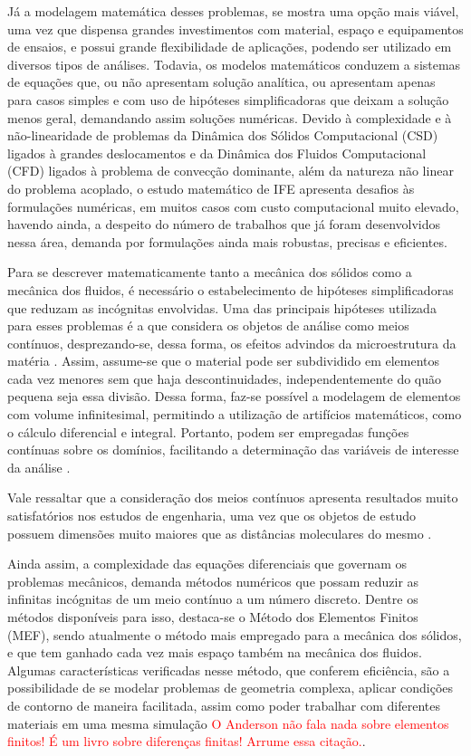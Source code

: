 Já a modelagem matemática desses problemas, se mostra uma opção mais viável, uma vez que dispensa grandes investimentos com material, espaço e equipamentos de ensaios, e possui grande flexibilidade de aplicações, podendo ser utilizado em diversos tipos de análises. Todavia, os modelos matemáticos conduzem a sistemas de equações que, ou não apresentam solução analítica, ou apresentam apenas para casos simples e com uso de hipóteses simplificadoras que deixam a solução menos geral, demandando assim soluções numéricas. Devido à complexidade e à não-linearidade de problemas da Dinâmica dos Sólidos Computacional (CSD) ligados à grandes deslocamentos e da Dinâmica dos Fluidos Computacional (CFD) ligados à problema de convecção dominante, além da natureza não linear do problema acoplado, o estudo matemático de IFE apresenta desafios às formulações numéricas, em muitos casos com custo computacional muito elevado, havendo ainda, a despeito do número de trabalhos que já foram desenvolvidos nessa área, demanda por formulações ainda mais robustas, precisas e eficientes.

Para se descrever matematicamente tanto a mecânica dos sólidos como a mecânica dos fluidos, é necessário o estabelecimento de hipóteses simplificadoras que reduzam as incógnitas envolvidas. Uma das principais hipóteses utilizada para esses problemas é a que considera os objetos de análise como meios contínuos, desprezando-se, dessa forma, os efeitos advindos da microestrutura da matéria \cite{lai2009introduction, mase2009continuum}. Assim, assume-se que o material pode ser subdividido em elementos cada vez menores sem que haja descontinuidades, independentemente do quão pequena seja essa divisão. Dessa forma, faz-se possível a modelagem de elementos com volume infinitesimal, permitindo a utilização de artifícios matemáticos, como o cálculo diferencial e integral. Portanto, podem ser empregadas funções contínuas sobre os domínios, facilitando a determinação das variáveis de interesse da análise \cite{irgens2008continuum, lai2009introduction, malvern1969introduction}.

Vale ressaltar que a consideração dos meios contínuos apresenta resultados muito satisfatórios nos estudos de engenharia, uma vez que os objetos de estudo possuem dimensões muito maiores que as distâncias moleculares do mesmo \cite{malvern1969introduction, mase2009continuum}.

Ainda assim, a complexidade das equações diferenciais que governam os problemas mecânicos, demanda métodos numéricos que possam reduzir as infinitas incógnitas de um meio contínuo a um número discreto. Dentre os métodos disponíveis para isso, destaca-se o Método dos Elementos Finitos (MEF), sendo atualmente o método mais empregado para a mecânica dos sólidos, e que tem ganhado cada vez mais espaço também na mecânica dos fluidos. Algumas características verificadas nesse método, que conferem eficiência, são a possibilidade de se modelar problemas de geometria complexa, aplicar condições de contorno de maneira facilitada, assim como poder trabalhar com diferentes materiais em uma mesma simulação \cite{anderson1995computational} \textcolor{red}{O Anderson não fala nada sobre elementos finitos! É um livro sobre diferenças finitas! Arrume essa citação.}.

